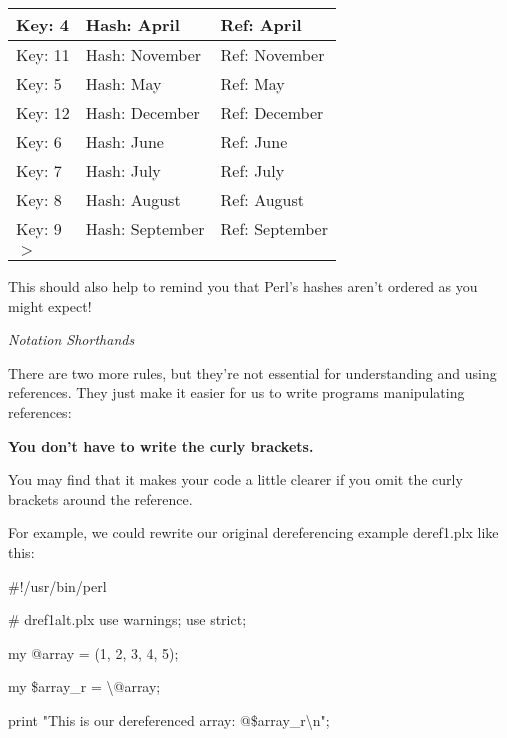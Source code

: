 \documentclass[a4paper,11pt]{book}
\begin{document}
\begin{tabular}{|p{0.6in}|p{0.8in}|p{0.7in}|} \hline 
Key: 4 & Hash: April & Ref: April \\ \hline 
Key: 11 & Hash: November & Ref: November \\ \hline 
Key: 5 & Hash: May & Ref: May \\ \hline 
Key: 12 & Hash: December & Ref: December \\ \hline 
Key: 6 & Hash: June & Ref: June \\ \hline 
Key: 7 & Hash: July & Ref: July \\ \hline 
Key: 8 & Hash: August & Ref: August \\ \hline 
Key: 9 & Hash: September & Ref: September \\ \hline 
$>$ &  &  \\ \hline 
\end{tabular}



\noindent This should also help to remind you that Perl's hashes aren't ordered as you might expect!

\noindent 

\noindent \textit{Notation Shorthands}

\noindent There are two more rules, but they're not essential for understanding and using references. They just make it easier for us to write programs manipulating references:

\noindent 

\noindent 

\noindent \textbf{You don't have to write the curly brackets.}

\noindent 

\noindent 

\noindent You may find that it makes your code a little clearer if you omit the curly brackets around the reference.

\noindent For example, we could rewrite our original dereferencing example deref1.plx like this:

\noindent 

\noindent \#!/usr/bin/perl

\noindent \# dref1alt.plx use warnings; use strict;

\noindent 

\noindent my @array = (1, 2, 3, 4, 5);

\noindent my \$array\_r = \textbackslash @array;

\noindent 

\noindent print "This is our dereferenced array: @\$array\_r\textbackslash n";
\end{document}
